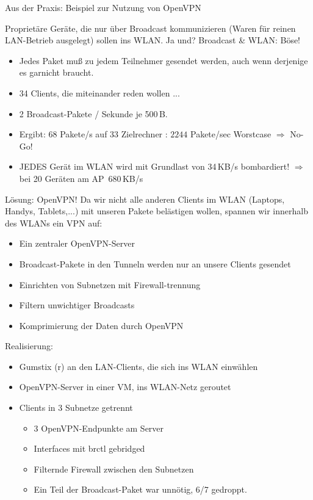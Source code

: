 \documentclass{beamer}
\begin{document}
\begin{frame}{Aus der Praxis: Beispiel zur Nutzung von OpenVPN}

	Proprietäre Geräte, die nur über Broadcast kommunizieren (Waren für reinen LAN-Betrieb ausgelegt) sollen ins WLAN.
	\pause
	Ja und?
	\pause
	Broadcast \& WLAN: Böse!

  \begin{itemize}
    \item Jedes Paket muß zu jedem Teilnehmer gesendet werden, auch wenn derjenige es garnicht braucht.
    \item 34 Clients, die miteinander reden wollen ... 
    \item 2 Broadcast-Pakete / Sekunde je 500\,B.
	    \pause
    \item Ergibt: $68$ Pakete/s auf $33$ Zielrechner : $2244$ Pakete/sec Worstcase $\Rightarrow$ No-Go!
	    \pause
    \item JEDES Gerät im WLAN wird mit Grundlast von 34\,KB/s bombardiert! $\Rightarrow$ bei 20 Geräten am AP~680\,KB/s
  \end{itemize}


\end{frame}

\begin{frame}{Lösung: OpenVPN!}
	Da wir nicht alle anderen Clients im WLAN (Laptops, Handys, Tablets,...) mit unseren Pakete belästigen wollen, spannen wir innerhalb des WLANs ein VPN auf:
	\pause
  \begin{itemize}
    \item Ein zentraler OpenVPN-Server
    \item Broadcast-Pakete in den Tunneln werden nur an unsere Clients gesendet
    \item Einrichten von Subnetzen mit Firewall-trennung
    \item Filtern unwichtiger Broadcasts
    \item Komprimierung der Daten durch OpenVPN
  \end{itemize}
\end{frame}

\begin{frame}{Realisierung:}
  \begin{itemize}
	  \item Gumstix (r) an den LAN-Clients, die sich ins WLAN einwählen
	  \item OpenVPN-Server in einer VM, ins WLAN-Netz geroutet
	  \item Clients in 3 Subnetze getrennt
	  \begin{itemize}
		  \item 3 OpenVPN-Endpunkte am Server
		  \item Interfaces mit brctl gebridged
		  \item Filternde Firewall zwischen den Subnetzen
		  \item Ein Teil der Broadcast-Paket war unnötig, 6/7 gedroppt.
	  \end{itemize}
  \end{itemize}
\end{frame}
\end{document}
